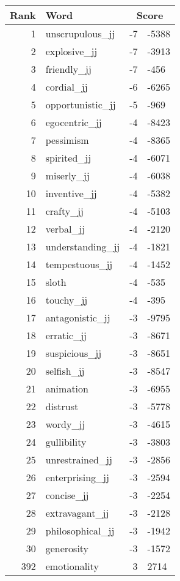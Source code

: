 \begin{longtable}[!htbp]{| rlr@{.}l |}
    \hline
    \textbf{Rank} & \textbf{Word} & \multicolumn{2}{c|}{\textbf{Score}} \\
    \hline
    \endhead
    1 & unscrupulous\_jj & -7 & -5388 \\
    2 & explosive\_jj & -7 & -3913 \\
    3 & friendly\_jj & -7 & -456 \\
    4 & cordial\_jj & -6 & -6265 \\
    5 & opportunistic\_jj & -5 & -969 \\
    6 & egocentric\_jj & -4 & -8423 \\
    7 & pessimism & -4 & -8365 \\
    8 & spirited\_jj & -4 & -6071 \\
    9 & miserly\_jj & -4 & -6038 \\
    10 & inventive\_jj & -4 & -5382 \\
    11 & crafty\_jj & -4 & -5103 \\
    12 & verbal\_jj & -4 & -2120 \\
    13 & understanding\_jj & -4 & -1821 \\
    14 & tempestuous\_jj & -4 & -1452 \\
    15 & sloth & -4 & -535 \\
    16 & touchy\_jj & -4 & -395 \\
    17 & antagonistic\_jj & -3 & -9795 \\
    18 & erratic\_jj & -3 & -8671 \\
    19 & suspicious\_jj & -3 & -8651 \\
    20 & selfish\_jj & -3 & -8547 \\
    21 & animation & -3 & -6955 \\
    22 & distrust & -3 & -5778 \\
    23 & wordy\_jj & -3 & -4615 \\
    24 & gullibility & -3 & -3803 \\
    25 & unrestrained\_jj & -3 & -2856 \\
    26 & enterprising\_jj & -3 & -2594 \\
    27 & concise\_jj & -3 & -2254 \\
    28 & extravagant\_jj & -3 & -2128 \\
    29 & philosophical\_jj & -3 & -1942 \\
    30 & generosity & -3 & -1572 \\
    392 & emotionality & 3 & 2714 \\

\end{longtable}
